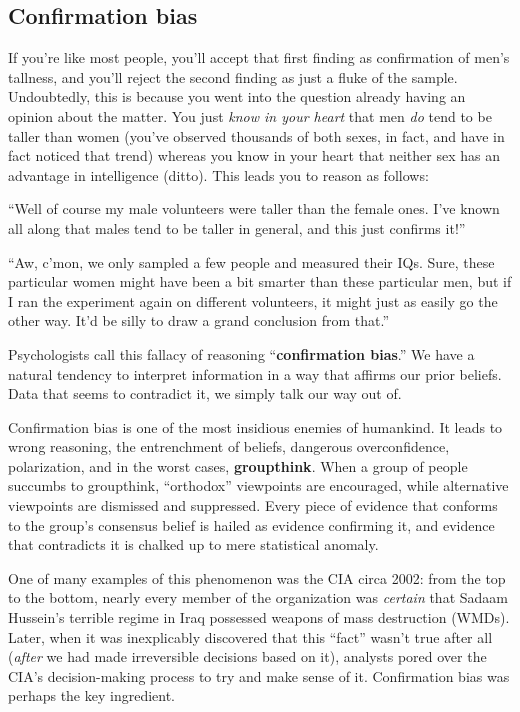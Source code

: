 \subsection{Confirmation bias}


If you're like most people, you'll accept that first finding as confirmation of
men's tallness, and you'll reject the second finding as just a fluke of the
sample. Undoubtedly, this is because you went into the question already having
an opinion about the matter. You just \textit{know in your heart} that men
\textit{do} tend to be taller than women (you've observed thousands of both
sexes, in fact, and have in fact noticed that trend) whereas you know in your
heart that neither sex has an advantage in intelligence (ditto). This leads you
to reason as follows:

\begin{compactenum}
\item ``Well of course my male volunteers were taller than the female ones.
I've known all along that males tend to be taller in general, and this just
confirms it!''
\item ``Aw, c'mon, we only sampled a few people and measured their IQs. Sure,
these particular women might have been a bit smarter than these particular men,
but if I ran the experiment again on different volunteers, it might just as
easily go the other way. It'd be silly to draw a grand conclusion from that.''
\end{compactenum}

Psychologists call this fallacy of reasoning ``\textbf{confirmation bias}.'' We
have a natural tendency to interpret information in a way that affirms our
prior beliefs. Data that seems to contradict it, we simply talk our way out of.


Confirmation bias is one of the most insidious enemies of humankind. It leads
to wrong reasoning, the entrenchment of beliefs, dangerous overconfidence,
polarization, and in the worst cases, \textbf{groupthink}. When a group of
people succumbs to groupthink, ``orthodox'' viewpoints are encouraged, while
alternative viewpoints are dismissed and suppressed. Every piece of evidence
that conforms to the group's consensus belief is hailed as evidence confirming
it, and evidence that contradicts it is chalked up to mere statistical anomaly.


One of many examples of this phenomenon was the CIA circa 2002: from the top to
the bottom, nearly every member of the organization was \textit{certain} that
Sadaam Hussein's terrible regime in Iraq possessed weapons of mass destruction
(WMDs). Later, when it was inexplicably discovered that this ``fact'' wasn't
true after all (\textit{after} we had made irreversible decisions based on it),
analysts pored over the CIA's decision-making process to try and make sense of
it. Confirmation bias was perhaps the key ingredient.

